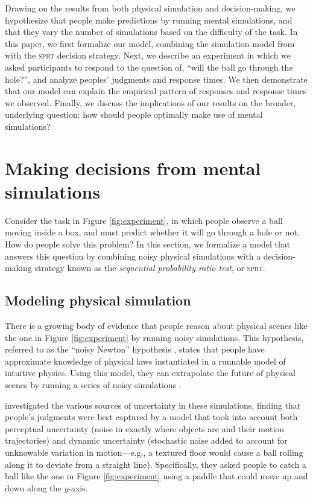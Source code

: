 \documentclass[10pt,letterpaper]{article}
\begin{document}
Drawing on the results from both physical simulation and decision-making, we hypothesize that people make predictions by running mental simulations, and that they vary the number of simulations based on the difficulty of the task.
In this paper, we first formalize our model, combining the simulation model from  with the \textsc{sprt} decision strategy. 
Next, we describe an experiment in which we asked participants to respond to the question of, ``will the ball go through the hole?'', and analyze peoples' judgments and response times. 
We then demonstrate that our model can explain the empirical pattern of responses and response times we observed. 
Finally, we discuss the implications of our results on the broader, underlying question: how should people optimally make use of mental simulations?

\section{Making decisions from mental simulations}

Consider the task in Figure \ref{fig:experiment}, in which people observe a ball moving inside a box, and must predict whether it will go through a hole or not.
How do people solve this problem?
In this section, we formalize a model that answers this question by combining noisy physical simulations with a decision-making strategy known as the \emph{sequential probability ratio test}, or \textsc{sprt}.

\subsection{Modeling physical simulation}

There is a growing body of evidence that people reason about physical scenes like the one in Figure \ref{fig:experiment} by running noisy simulations.
This hypothesis, referred to as the ``noisy Newton'' hypothesis \cite{Sanborn2013}, states that people have approximate knowledge of physical laws instantiated in a runnable model of intuitive physics.
Using this model, they can extrapolate the future of physical scenes by running a series of noisy simulations \cite{Smith:2013fc,Battaglia2013,Smith:2013ug,Smith:2013th,Smith:2014tx,Ullman:2014ut,Hamrick:2015}.

 investigated the various sources of uncertainty in these simulations, finding that people's judgments were best captured by a model that took into account both perceptual uncertainty (noise in exactly where objects are and their motion trajectories) and dynamic uncertainty (stochastic noise added to account for unknowable variation in motion---e.g., a textured floor would cause a ball rolling along it to deviate from a straight line).
Specifically, they asked people to catch a ball like the one in Figure \ref{fig:experiment} using a paddle that could move up and down along the $y$-axis.
\end{document}
